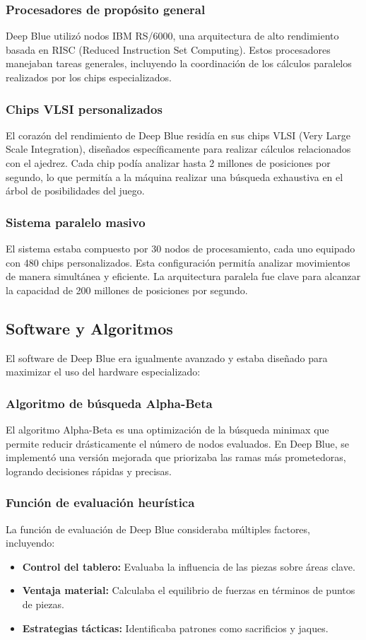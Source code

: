 \documentclass[12pt,a4paper]{article}
\begin{document}
\subsubsection*{Procesadores de propósito general}
Deep Blue utilizó nodos IBM RS/6000, una arquitectura de alto rendimiento basada en RISC (Reduced Instruction Set Computing). Estos procesadores manejaban tareas generales, incluyendo la coordinación de los cálculos paralelos realizados por los chips especializados.

\subsubsection*{Chips VLSI personalizados}
El corazón del rendimiento de Deep Blue residía en sus chips VLSI (Very Large Scale Integration), diseñados específicamente para realizar cálculos relacionados con el ajedrez. Cada chip podía analizar hasta 2 millones de posiciones por segundo, lo que permitía a la máquina realizar una búsqueda exhaustiva en el árbol de posibilidades del juego.

\subsubsection*{Sistema paralelo masivo}
El sistema estaba compuesto por 30 nodos de procesamiento, cada uno equipado con 480 chips personalizados. Esta configuración permitía analizar movimientos de manera simultánea y eficiente. La arquitectura paralela fue clave para alcanzar la capacidad de 200 millones de posiciones por segundo.

\subsection{Software y Algoritmos}
El software de Deep Blue era igualmente avanzado y estaba diseñado para maximizar el uso del hardware especializado:

\subsubsection*{Algoritmo de búsqueda Alpha-Beta}
El algoritmo Alpha-Beta es una optimización de la búsqueda minimax que permite reducir drásticamente el número de nodos evaluados. En Deep Blue, se implementó una versión mejorada que priorizaba las ramas más prometedoras, logrando decisiones rápidas y precisas.

\subsubsection*{Función de evaluación heurística}
La función de evaluación de Deep Blue consideraba múltiples factores, incluyendo:
\begin{itemize}
    \item \textbf{Control del tablero:} Evaluaba la influencia de las piezas sobre áreas clave.
    \item \textbf{Ventaja material:} Calculaba el equilibrio de fuerzas en términos de puntos de piezas.
    \item \textbf{Estrategias tácticas:} Identificaba patrones como sacrificios y jaques.
\end{itemize}
\end{document}
